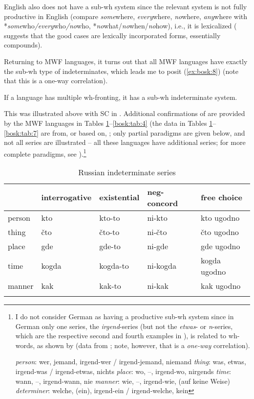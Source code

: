 \documentclass[output=paper,colorlinks,citecolor=brown]{langscibook}
\begin{document}
English also does not have a sub-wh system since the relevant system is not fully productive in English (compare \textit{some}where, \textit{every}where, \textit{no}where, \textit{any}where with *\textit{some}who\textit{/every}who\textit{/no}who, *\textit{no}what/\textit{no}when/\textit{no}how), i.e., it is lexicalized (\citealt{Cheng1991} suggests that the good cases are lexically incorporated forms, essentially compounds).

Returning to MWF languages, it turns out that all MWF languages have exactly the sub-wh type of indeterminates, which leads me to posit (\ref{ex:bosk:8}) (note that this is a one-way correlation).
 
\ea\label{ex:bosk:8} If a language has multiple wh-fronting, it has a sub-wh indeterminate system.\z

\noindent This was illustrated above with SC in . Additional confirmations of  are provided by the MWF languages in Tables \ref{bosk:tab:1}--\ref{bosk:tab:4} (the data in Tables \ref{bosk:tab:1}--\ref{bosk:tab:7} are from, or based on, \citealt{Haspelmath1997}; only partial paradigms are given below, and not all series are illustrated -- all these languages have additional series; for more complete paradigms, see \citealt{Haspelmath1997}).\footnote{I do not consider German as having a productive sub-wh system since in German only one series, the \textit{irgend}-series (but not the \textit{etwas}- or \textit{n}-series, which are the respective second and fourth examples in ), is related to wh-words, as shown by  (data from \citealt{Haspelmath1997}; note, however, that  is a \textit{one-way} correlation).

\ea\label{ex:bosk:germ} 
\ea 
\textit{person}: wer, jemand, irgend-wer / irgend-jemand, niemand
\ex \textit{thing}: was, etwas, irgend-was / irgend-etwas, nichts
\ex \textit{place}: wo, --, irgend-wo, nirgends
\ex \textit{time}: wann, --, irgend-wann, nie
\ex \textit{manner}: wie, --, irgend-wie, (auf keine Weise)
\ex \textit{determiner}: welche,  (ein), irgend-ein / irgend-welche, kein
\z
\z

}

\begin{table}
\begin{tabularx}{.90\textwidth}{Xllll}
\lsptoprule
& interrogative & existential & neg-concord & free choice\\\midrule
person & kto & kto-to & ni-kto & kto ugodno\\
thing & čto & čto-to & ni-čto & čto ugodno\\
place & gde & gde-to & ni-gde & gde ugodno\\
time & kogda & kogda-to & ni-kogda & kogda ugodno\\
manner & kak & kak-to & ni-kak & kak ugodno\\
\lspbottomrule
\end{tabularx}
    \caption{Russian indeterminate series}
    \label{bosk:tab:1}
\end{table}
 
\end{document}
